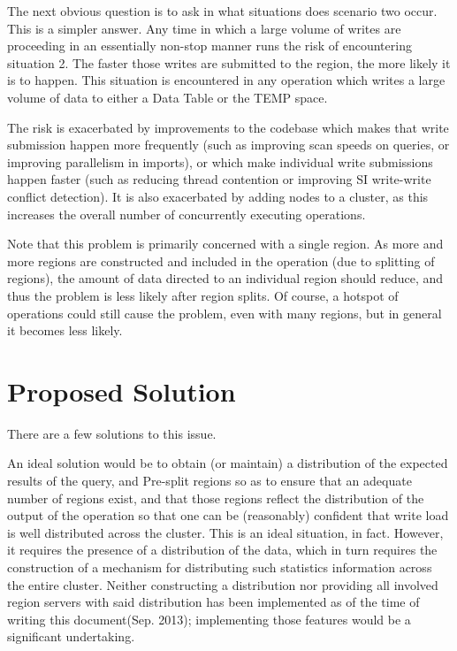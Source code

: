 \documentclass[11pt]{article}
\begin{document}
The next obvious question is to ask in what situations does scenario two occur. This is a simpler answer. Any time in which a large volume of writes are proceeding
in an essentially non-stop manner runs the risk of encountering situation 2. The faster those writes are submitted to the region, the more likely it is to happen.
This situation is encountered in any operation which writes a large volume of data to either a Data Table or the TEMP space.

The risk is exacerbated by improvements to the codebase which makes that write submission happen more frequently (such as improving scan speeds on queries, or 
improving parallelism in imports), or which make individual write submissions happen faster (such as reducing thread contention or improving SI write-write conflict
detection). It is also exacerbated by adding nodes to a cluster, as this increases the overall number of concurrently executing operations.

Note that this problem is primarily concerned with a single region. As more and more regions are constructed and included in the operation (due to splitting of 
regions), the amount of data directed to an individual region should reduce, and thus the problem is less likely after region splits. Of course, a hotspot of
operations could still cause the problem, even with many regions, but in general it becomes less likely.
 
\section{Proposed Solution}
There are a few solutions to this issue.

An ideal solution would be to obtain (or maintain) a distribution of the expected results of the query, and Pre-split regions so as to ensure that an adequate number
of regions exist, and that those regions reflect the distribution of the output of the operation so that one can be (reasonably) confident that write load
is well distributed across the cluster. This is an ideal situation, in fact. However, it requires the presence of a distribution of the data, which in turn requires
the construction of a mechanism for distributing such statistics information across the entire cluster. Neither constructing a distribution nor providing all 
involved region servers with said distribution has been implemented as of the time of writing this document(Sep. 2013); 
implementing those features would be a significant undertaking.
\end{document}
